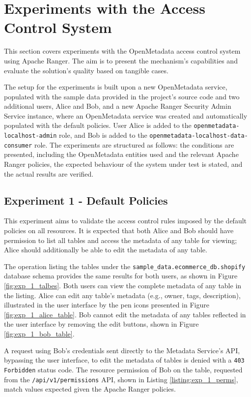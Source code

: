 \section{Experiments with the Access Control System}

This section covers experiments with the OpenMetadata access control system using Apache Ranger. The aim is to present the mechanism's capabilities and evaluate the solution's quality based on tangible cases.

The setup for the experiments is built upon a new OpenMetadata service, populated with the sample data provided in the project's source code and two additional users, Alice and Bob, and a new Apache Ranger Security Admin Service instance, where an OpenMetadata service was created and automatically populated with the default policies. User Alice is added to the \texttt{openmetadata-localhost-admin} role, and Bob is added to the \texttt{openmetadata-localhost-data-consumer} role. The experiments are structured as follows: the conditions are presented, including the OpenMetadata entities used and the relevant Apache Ranger policies, the expected behaviour of the system under test is stated, and the actual results are verified.

\subsection{Experiment 1 - Default Policies}

This experiment aims to validate the access control rules imposed by the default policies on all resources. It is expected that both Alice and Bob should have permission to list all tables and access the metadata of any table for viewing; Alice should additionally be able to edit the metadata of any table.

The operation listing the tables under the \texttt{sample_data.ecommerce_db.shopify} database schema provides the same results for both users, as shown in Figure \ref{fig:exp_1_talbes}. Both users can view the complete metadata of any table in the listing. Alice can edit any table's metadata (e.g., owner, tags, description), illustrated in the user interface by the pen icons presented in Figure \ref{fig:exp_1_alice_table}. Bob cannot edit the metadata of any tables reflected in the user interface by removing the edit buttons, shown in Figure \ref{fig:exp_1_bob_table}. 

A request using Bob's credentials sent directly to the Metadata Service's API, bypassing the user interface, to edit the metadata of tables is denied with a \texttt{403 Forbidden} status code. The resource permission of Bob on the table, requested from the \texttt{/api/v1/permissions} API, shown in Listing \ref{listing:exp_1_perms}, match values expected given the Apache Ranger policies.

